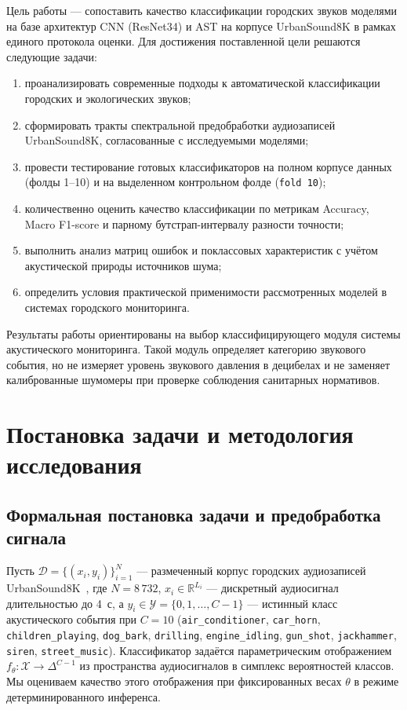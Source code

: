 \documentclass[pdflatex,sn-mathphys-num]{sn-jnl}
\begin{document}
Цель работы --- сопоставить качество классификации городских звуков моделями на базе архитектур CNN (ResNet34) и AST на корпусе UrbanSound8K в рамках единого протокола оценки. Для достижения поставленной цели решаются следующие задачи:
\begin{enumerate}
    \item проанализировать современные подходы к автоматической классификации городских и экологических звуков;
    \item сформировать тракты спектральной предобработки аудиозаписей UrbanSound8K, согласованные с исследуемыми моделями;
    \item провести тестирование готовых классификаторов на полном корпусе данных (фолды 1--10) и на выделенном контрольном фолде (\texttt{fold 10});
    \item количественно оценить качество классификации по метрикам Accuracy, Macro F1-score и парному бутстрап-интервалу разности точности;
    \item выполнить анализ матриц ошибок и поклассовых характеристик с учётом акустической природы источников шума;
    \item определить условия практической применимости рассмотренных моделей в системах городского мониторинга.
\end{enumerate}

Результаты работы ориентированы на выбор классифицирующего модуля системы акустического мониторинга. Такой модуль определяет категорию звукового события, но не измеряет уровень звукового давления в децибелах и не заменяет калиброванные шумомеры при проверке соблюдения санитарных нормативов.

\section{Постановка задачи и методология исследования}\label{sec:methodology}

\subsection{Формальная постановка задачи и предобработка сигнала}

Пусть $\mathcal{D} = \{(x_i, y_i)\}_{i=1}^{N}$ --- размеченный корпус городских аудиозаписей UrbanSound8K~\cite{ref3,ref4}, где $N = 8\,732$, $x_i \in \mathbb{R}^{L_i}$ --- дискретный аудиосигнал длительностью до 4~с, а $y_i \in \mathcal{Y} = \{0, 1, \dots, C-1\}$ --- истинный класс акустического события при $C = 10$ (\texttt{air\_conditioner}, \texttt{car\_horn}, \texttt{children\_playing}, \texttt{dog\_bark}, \texttt{drilling}, \texttt{engine\_idling}, \texttt{gun\_shot}, \texttt{jackhammer}, \texttt{siren}, \texttt{street\_music}). Классификатор задаётся параметрическим отображением $f_{\theta}: \mathcal{X} \to \Delta^{C-1}$ из пространства аудиосигналов в симплекс вероятностей классов. Мы оцениваем качество этого отображения при фиксированных весах $\theta$ в режиме детерминированного инференса.
\end{document}
